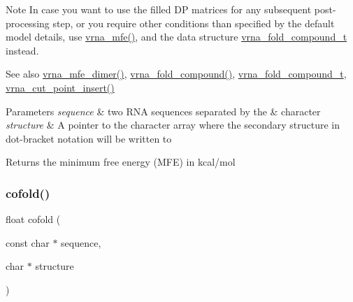 \begin{DoxyNote}{Note}
In case you want to use the filled DP matrices for any subsequent post-\/processing step, or you require other conditions than specified by the default model details, use \hyperlink{group__mfe__fold_gabd3b147371ccf25c577f88bbbaf159fd}{vrna\+\_\+mfe()}, and the data structure \hyperlink{group__fold__compound_ga1b0cef17fd40466cef5968eaeeff6166}{vrna\+\_\+fold\+\_\+compound\+\_\+t} instead.
\end{DoxyNote}
\begin{DoxySeeAlso}{See also}
\hyperlink{group__mfe__cofold_gaab22d10c1190f205f16a77cab9d5d3ee}{vrna\+\_\+mfe\+\_\+dimer()}, \hyperlink{group__fold__compound_ga6601d994ba32b11511b36f68b08403be}{vrna\+\_\+fold\+\_\+compound()}, \hyperlink{group__fold__compound_ga1b0cef17fd40466cef5968eaeeff6166}{vrna\+\_\+fold\+\_\+compound\+\_\+t}, \hyperlink{group__string__utils_ga74f05ece32ea73b59f84a7452afd5fae}{vrna\+\_\+cut\+\_\+point\+\_\+insert()}
\end{DoxySeeAlso}

\begin{DoxyParams}{Parameters}
{\em sequence} & two R\+NA sequences separated by the \textquotesingle{}\&\textquotesingle{} character \\
\hline
{\em structure} & A pointer to the character array where the secondary structure in dot-\/bracket notation will be written to \\
\hline
\end{DoxyParams}
\begin{DoxyReturn}{Returns}
the minimum free energy (M\+FE) in kcal/mol 
\end{DoxyReturn}
\mbox{\label{group__mfe__cofold_gabc8517f22cfe70595ee81fc837910d52}} 
\subsubsection{\texorpdfstring{cofold()}{cofold()}}
{\footnotesize\ttfamily float cofold (\begin{DoxyParamCaption}\item[{const char $\ast$}]{sequence,  }\item[{char $\ast$}]{structure }\end{DoxyParamCaption})}



